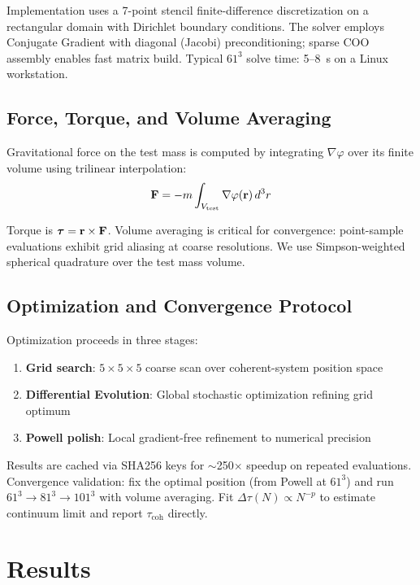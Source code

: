 \documentclass[10pt,twocolumn]{article}
\begin{document}
Implementation uses a 7-point stencil finite-difference discretization on a rectangular domain with Dirichlet boundary conditions. The solver employs Conjugate Gradient with diagonal (Jacobi) preconditioning; sparse COO assembly enables fast matrix build. Typical $61^3$ solve time: 5--8~s on a Linux workstation.

\subsection{Force, Torque, and Volume Averaging}

Gravitational force on the test mass is computed by integrating $\nabla\varphi$ over its finite volume using trilinear interpolation:
\begin{equation}
{\bf F} = -m \int_{V_{\text{test}}} \nabla\varphi({\bf r}) \, d^3r
\end{equation}

Torque is $\boldsymbol{\tau} = {\bf r} \times {\bf F}$. Volume averaging is critical for convergence: point-sample evaluations exhibit grid aliasing at coarse resolutions. We use Simpson-weighted spherical quadrature over the test mass volume.

\subsection{Optimization and Convergence Protocol}

Optimization proceeds in three stages:
\begin{enumerate}
\item \textbf{Grid search}: $5 \times 5 \times 5$ coarse scan over coherent-system position space
\item \textbf{Differential Evolution}: Global stochastic optimization refining grid optimum
\item \textbf{Powell polish}: Local gradient-free refinement to numerical precision
\end{enumerate}

Results are cached via SHA256 keys for $\sim$250$\times$ speedup on repeated evaluations. Convergence validation: fix the optimal position (from Powell at $61^3$) and run $61^3 \rightarrow 81^3 \rightarrow 101^3$ with volume averaging. Fit $\Delta\tau(N) \propto N^{-p}$ to estimate continuum limit and report $\tau_{\text{coh}}$ directly.

\section{Results}
\end{document}
